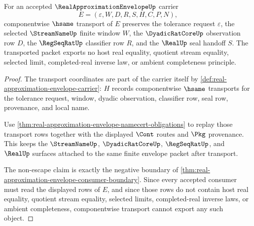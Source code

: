 \begin{theorem}
\label{thm:real-approximation-envelope-transport-nonescape}
For an accepted $\RealApproximationEnvelopeUp$ carrier
$$
E=(\varepsilon,W,D,R,S,H,C,P,N),
$$
componentwise $\hsame$ transport of $E$ preserves the tolerance request $\varepsilon$, the selected $\StreamNameUp$ finite window $W$, the $\DyadicRatCoreUp$ observation row $D$, the $\RegSeqRatUp$ classifier row $R$, and the $\RealUp$ seal handoff $S$. The transported packet exports no host real equality, quotient stream equality, selected limit, completed-real inverse law, or ambient completeness principle.
\end{theorem}
\begin{proof}
The transport coordinates are part of the carrier itself by \autoref{def:real-approximation-envelope-carrier}: $H$ records componentwise $\hsame$ transports for the tolerance request, window, dyadic observation, classifier row, seal row, provenance, and local name.

Use \autoref{thm:real-approximation-envelope-namecert-obligations} to replay those transport rows together with the displayed $\Cont$ routes and $\Pkg$ provenance. This keeps the $\StreamNameUp$, $\DyadicRatCoreUp$, $\RegSeqRatUp$, and $\RealUp$ surfaces attached to the same finite envelope packet after transport.

The non-escape claim is exactly the negative boundary of \autoref{thm:real-approximation-envelope-consumer-boundary}. Since every accepted consumer must read the displayed rows of $E$, and since those rows do not contain host real equality, quotient stream equality, selected limits, completed-real inverse laws, or ambient completeness, componentwise transport cannot export any such object.
\end{proof}

